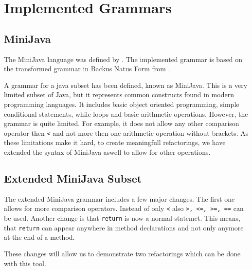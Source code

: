 
\section{Implemented Grammars}

\subsection{MiniJava}

The MiniJava language was defined by \cite{Appel2002-kleene}. The implemented grammar is based on the transformed grammar in Backus Natus Form from \cite{minijava_bnf}.

A grammar for a java subset has been defined, known as MiniJava. This is a very limited subset of Java, but it represents common constructs found in modern programming languages.
It includes basic object oriented programming, simple conditional statements, while loops and basic arithmetic operations. However, the grammar is quite limited. For example, it does not
allow any other comparison operator then \verb|<| and not more then one arithmetic operation without brackets. As these limitations make it hard, to create meaningfull refactorings, we have extended
the syntax of MiniJava aswell to allow for other operations.

\subsection{Extended MiniJava Subset}

The extended MiniJava grammar includes a few major changes. The first one allows for more comparison operators. Instead of only \verb|<| also \verb|>, <=, >=, ==| can be used.
Another change is that \verb|return| is now a normal statemet. This means, that \verb|return| can appear anywhere in method declarations and not only anymore at the end of a method.

These changes will allow us to demonstrate two refactorings which can be done with this tool. 
